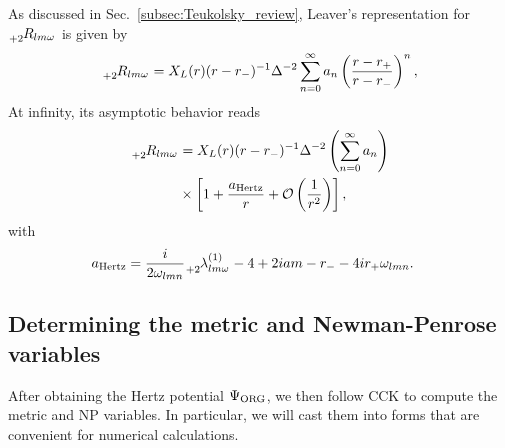 \documentclass[aps,prd,amsmath,floats,floatfix, twocolumn,
superscriptaddress,nofootinbib,showpacs]{revtex4-1}
\newcommand{\hertz}{\Psi_{\rm ORG}}
\begin{document}
As discussed in Sec.~\ref{subsec:Teukolsky_review}, Leaver's representation for $\tensor[_{+2}]{{R_{lm\omega}}}{}$ is given by
\begin{align}
    \tensor[_{+2}]{{R_{lm\omega}}}{} =X_L(r) (r-r_-)^{-1} \Delta^{-2} \sum^\infty_{n=0} a_n \left( \frac{r-r_+}{r-r_-}\right)^n, \label{eq:leaver_hertz}
\end{align}
At infinity, its asymptotic behavior reads
\begin{align}
    \tensor[_{+2}]{{R_{lm\omega}}}{} &=X_L(r) (r-r_-)^{-1} \Delta^{-2}\left(\sum^\infty_{n=0} a_n\right) \notag \\
    &\times\left[1+\frac{a_{\rm Hertz}}{r}+\mathcal{O}\left(\frac{1}{r^2}\right)\right],
\end{align}
with
\begin{align}
    &a_{\rm Hertz}=\frac{i}{2\omega_{lmn}} \tensor[_{+2}]{{\lambda_{lm\omega}^{(1)}}}{}-4+2iam-r_--4ir_+\omega_{lmn}.
\end{align}

\subsection{Determining the metric and Newman-Penrose variables}
\label{subsec:metric_reconstruction}
After obtaining the Hertz potential $\hertz$, we then follow CCK to compute the metric and NP variables. In particular, we will cast them into forms that are convenient for numerical calculations.
\end{document}

